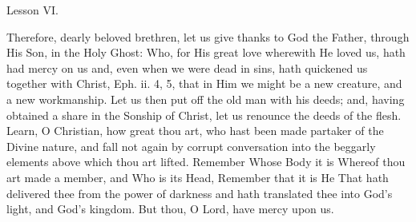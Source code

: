 {  \bigskip{}
  {
    \hfil{Lesson VI.}\hfil

    \begin{parcolumns}[rulebetween,colwidths={1=.51\linewidth}]{2}
    {Therefore, dearly beloved brethren, let us give thanks to God the Father, through His Son, in the Holy Ghost: Who, for His great love wherewith He loved us, hath had mercy on us and, even when we were dead in sins, hath quickened us together with Christ, Eph. ii. 4, 5, that in Him we might be a new creature, and a new workmanship. Let us then put off the old man with his deeds; and, having obtained a share in the Sonship of Christ, let us renounce the deeds of the flesh. Learn, O Christian, how great thou art, who hast been made partaker of the Divine nature, and fall not again by corrupt conversation into the beggarly elements above which thou art lifted. Remember Whose Body it is Whereof thou art made a member, and Who is its Head, Remember that it is He That hath delivered thee from the power of darkness and hath translated thee into God's light, and God's kingdom.
      But thou, O Lord, have mercy upon us.}
    \end{parcolumns}

  }

  {
    \medskip
  }
}